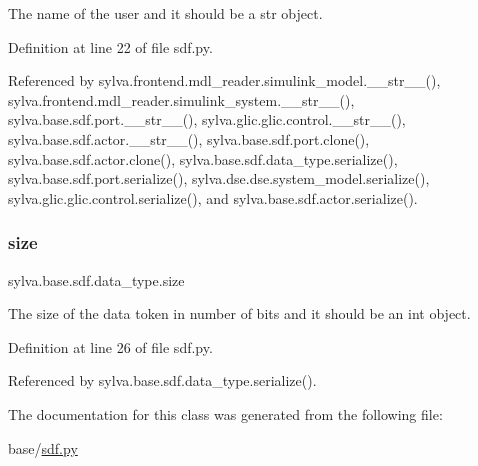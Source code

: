 The name of the user and it should be a str object. 



Definition at line 22 of file sdf.\+py.



Referenced by sylva.\+frontend.\+mdl\+\_\+reader.\+simulink\+\_\+model.\+\_\+\+\_\+str\+\_\+\+\_\+(), sylva.\+frontend.\+mdl\+\_\+reader.\+simulink\+\_\+system.\+\_\+\+\_\+str\+\_\+\+\_\+(), sylva.\+base.\+sdf.\+port.\+\_\+\+\_\+str\+\_\+\+\_\+(), sylva.\+glic.\+glic.\+control.\+\_\+\+\_\+str\+\_\+\+\_\+(), sylva.\+base.\+sdf.\+actor.\+\_\+\+\_\+str\+\_\+\+\_\+(), sylva.\+base.\+sdf.\+port.\+clone(), sylva.\+base.\+sdf.\+actor.\+clone(), sylva.\+base.\+sdf.\+data\+\_\+type.\+serialize(), sylva.\+base.\+sdf.\+port.\+serialize(), sylva.\+dse.\+dse.\+system\+\_\+model.\+serialize(), sylva.\+glic.\+glic.\+control.\+serialize(), and sylva.\+base.\+sdf.\+actor.\+serialize().

\mbox{\label{classsylva_1_1base_1_1sdf_1_1data__type_a76a0420d9704afe37b25895b906128b3}} 
\subsubsection{\texorpdfstring{size}{size}}
{\footnotesize\ttfamily sylva.\+base.\+sdf.\+data\+\_\+type.\+size}



The size of the data token in number of bits and it should be an int object. 



Definition at line 26 of file sdf.\+py.



Referenced by sylva.\+base.\+sdf.\+data\+\_\+type.\+serialize().



The documentation for this class was generated from the following file\+:\begin{DoxyCompactItemize}
\item 
base/\hyperlink{sdf_8py}{sdf.\+py}\end{DoxyCompactItemize}
